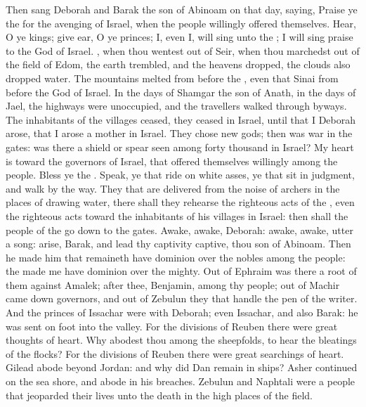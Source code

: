 \begin{biblechapter} %
 Then sang Deborah and Barak the son of Abinoam on that day, saying,
\verse Praise ye the \LORD for the avenging of Israel, when the people willingly offered themselves.
\verse Hear, O ye kings; give ear, O ye princes; I, even I, will sing unto the \LORD; I will sing praise to the \LORD God of Israel.
\verse \LORD, when thou wentest out of Seir, when thou marchedst out of the field of Edom, the earth trembled, and the heavens dropped, the clouds also dropped water.
\verse The mountains melted from before the \LORD, even that Sinai from before the \LORD God of Israel.
\verse In the days of Shamgar the son of Anath, in the days of Jael, the highways were unoccupied, and the travellers walked through byways.
\verse The inhabitants of the villages ceased, they ceased in Israel, until that I Deborah arose, that I arose a mother in Israel.
\verse They chose new gods; then was war in the gates: was there a shield or spear seen among forty thousand in Israel?
\verse My heart is toward the governors of Israel, that offered themselves willingly among the people. Bless ye the \LORD.
\verse Speak, ye that ride on white asses, ye that sit in judgment, and walk by the way.
\verse They that are delivered from the noise of archers in the places of drawing water, there shall they rehearse the righteous acts of the \LORD, even the righteous acts toward the inhabitants of his villages in Israel: then shall the people of the \LORD go down to the gates.
\verse Awake, awake, Deborah: awake, awake, utter a song: arise, Barak, and lead thy captivity captive, thou son of Abinoam.
\verse Then he made him that remaineth have dominion over the nobles among the people: the \LORD made me have dominion over the mighty.
\verse Out of Ephraim was there a root of them against Amalek; after thee, Benjamin, among thy people; out of Machir came down governors, and out of Zebulun they that handle the pen of the writer.
\verse And the princes of Issachar were with Deborah; even Issachar, and also Barak: he was sent on foot into the valley. For the divisions of Reuben there were great thoughts of heart.
\verse Why abodest thou among the sheepfolds, to hear the bleatings of the flocks? For the divisions of Reuben there were great searchings of heart.
\verse Gilead abode beyond Jordan: and why did Dan remain in ships? Asher continued on the sea shore, and abode in his breaches.
\verse Zebulun and Naphtali were a people that jeoparded their lives unto the death in the high places of the field.

\end{biblechapter}
